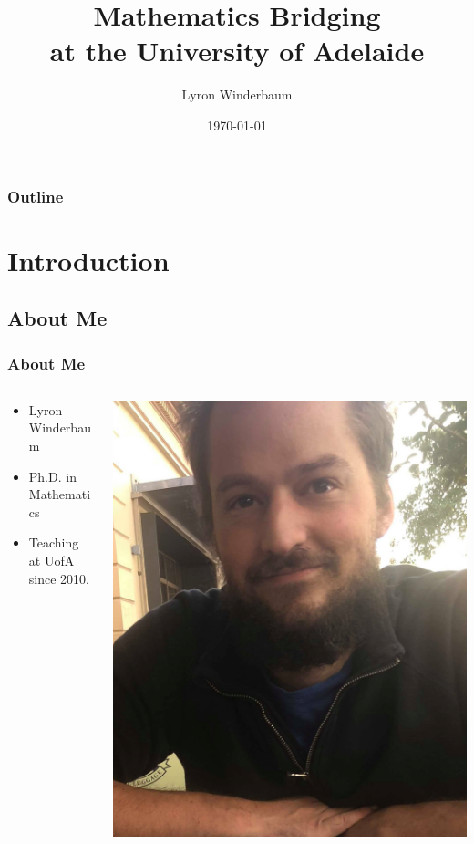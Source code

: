 \documentclass[14pt]{beamer}
\title{Mathematics Bridging \\ at the University of Adelaide}
\author{Lyron Winderbaum}
\institute{University of Adelaide}
\date{\today}
\begin{document}
\begin{frame}
\titlepage
\end{frame}

\begin{frame}
\frametitle{Outline}
\tableofcontents
\end{frame}

\section{Introduction}

\subsection{About Me}
\begin{frame}
\frametitle{About Me}
\begin{minipage}[0.4\textheight]{\textwidth}
\begin{columns}[T]
\begin{column}{0.6\textwidth}
\begin{itemize}
	\item Lyron Winderbaum
	\item Ph.D. in Mathematics
	\item Teaching at UofA since 2010.
\end{itemize}
\end{column}
\begin{column}{0.4\textwidth}
	\includegraphics[scale=0.1]{../../photos/portrait.jpg}
\end{column}
\end{columns}
\end{minipage}
\end{frame}
\end{document}
